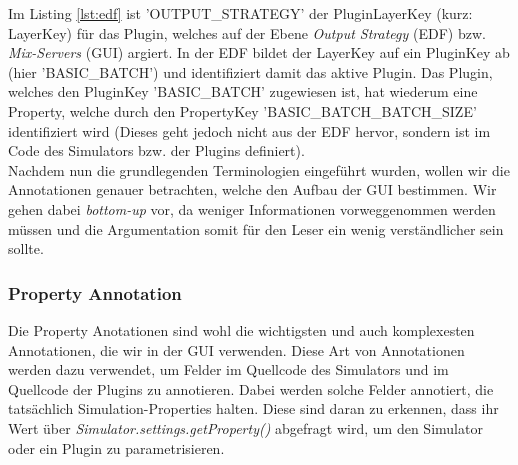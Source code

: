 \documentclass[a4paper, 11pt]{article} %
\begin{document}
Im Listing \ref{lst:edf} ist 'OUTPUT\_STRATEGY' der PluginLayerKey (kurz: LayerKey) für das Plugin, welches auf der Ebene \emph{Output Strategy} (EDF) bzw.  \emph{Mix-Servers} (GUI) argiert. In der EDF bildet der LayerKey auf ein PluginKey ab (hier 'BASIC\_BATCH') und identifiziert damit das aktive Plugin. Das Plugin, welches den PluginKey 'BASIC\_BATCH' zugewiesen ist, hat wiederum eine Property, welche durch den PropertyKey 'BASIC\_BATCH\_BATCH\_SIZE' identifiziert wird (Dieses geht jedoch nicht aus der EDF hervor, sondern ist im Code des Simulators bzw. der Plugins definiert).\\

Nachdem nun die grundlegenden Terminologien eingeführt wurden, wollen wir die Annotationen genauer betrachten, welche den Aufbau der GUI bestimmen. Wir gehen dabei \emph{bottom-up} vor, da weniger Informationen vorweggenommen werden müssen und die Argumentation somit für den Leser ein wenig verständlicher sein sollte.

\subsubsection{Property Annotation} %
\label{ssub:feld_annotation}
Die Property Anotationen sind wohl die wichtigsten und auch komplexesten Annotationen, die wir in der GUI verwenden. Diese Art von Annotationen werden dazu verwendet, um Felder im Quellcode des Simulators und im Quellcode der Plugins zu annotieren. Dabei werden solche Felder annotiert, die tatsächlich Simulation-Properties halten. Diese sind daran zu erkennen, dass ihr Wert über \emph{Simulator.settings.getProperty()} abgefragt wird, um den Simulator oder ein Plugin zu parametrisieren.\\
\end{document}
